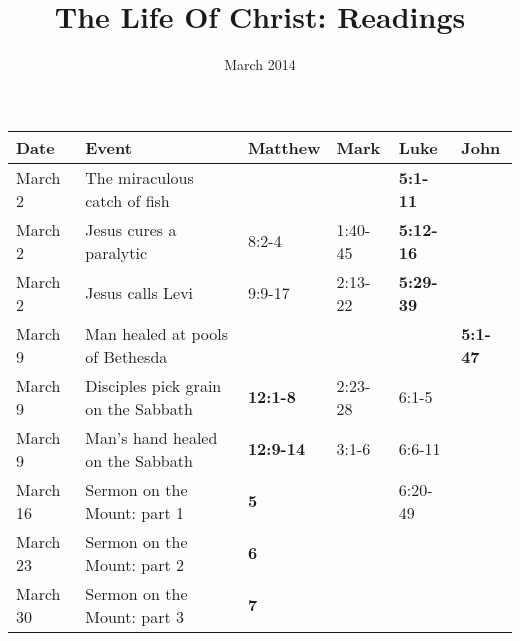 \documentclass{tufte-handout}
\title{The Life Of Christ: Readings}
\date{March 2014}  %
\begin{document}
\maketitle%


\begin{table*}[ht]
  \centering
  \selectfont
  \begin{tabular}{llllll}
    \toprule
    Date & Event & Matthew & Mark & Luke & John \\
    \midrule
    \rowcolor{yellow} March 2 & The miraculous catch of fish & & & \textbf{5:1-11} & \\
    \rowcolor{yellow} March 2 & Jesus cures a paralytic & 8:2-4 & 1:40-45 & \textbf{5:12-16} & \\
    \rowcolor{yellow} March 2 & Jesus calls Levi & 9:9-17 & 2:13-22 & \textbf{5:29-39} & \\
    March 9 & Man healed at pools of Bethesda & & & & \textbf{5:1-47} \\
    March 9 & Disciples pick grain on the Sabbath & \textbf{12:1-8} & 2:23-28 & 6:1-5  & \\
    March 9 & Man's hand healed on the Sabbath & \textbf{12:9-14} & 3:1-6 & 6:6-11 & \\
    March 16 & Sermon on the Mount: part 1 & \textbf{5} &  & 6:20-49 & \\
    March 23 & Sermon on the Mount: part 2 & \textbf{6} & & & \\
    March 30 & Sermon on the Mount: part 3 & \textbf{7} & & & \\
    \bottomrule
  \end{tabular}
  \label{tab:readings}
\end{table*}
\end{document}
